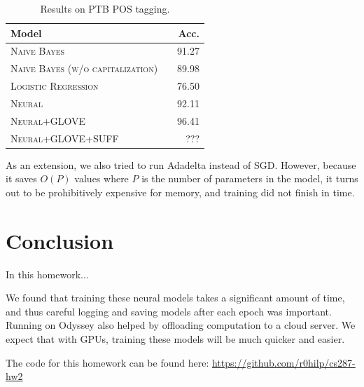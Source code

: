 \documentclass[11pt]{article}
\begin{document}
\begin{table}[h]
\centering
\begin{tabular}{llr}
 \toprule
 Model &  & Acc. \\
 \midrule
 \textsc{Naive Bayes} & & 91.27\\
 \textsc{Naive Bayes (w/o capitalization)} & & 89.98 \\
 \textsc{Logistic Regression} & & 76.50 \\
 \textsc{Neural} & & 92.11  \\
 \textsc{Neural+GLOVE} & &96.41 \\
 \textsc{Neural+GLOVE+SUFF} & & ??? \\
 \bottomrule
\end{tabular}
\caption{\label{tab:results} Results on PTB POS tagging.}
\end{table}

As an extension, we also tried to run Adadelta instead of SGD. However, because it saves $O(P)$ values where $P$ is the number of parameters in the model, it turns out to be prohibitively expensive for memory, and training did not finish in time.

\section{Conclusion}

In this homework...

We found that training these neural models takes a significant amount of time, and thus careful logging and saving models after each epoch was important. Running on Odyssey also helped by offloading computation to a cloud server. We expect that with GPUs, training these models will be much quicker and easier.

The code for this homework can be found here: \url{https://github.com/r0hilp/cs287-hw2}



\end{document}
